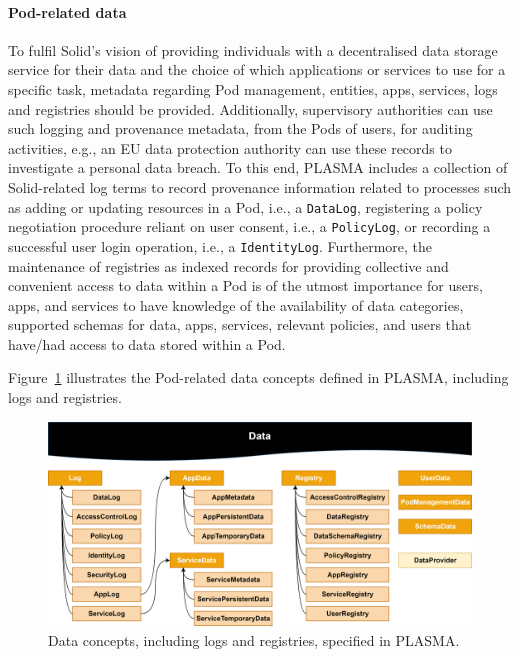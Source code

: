\paragraph{Pod-related data}
To fulfil Solid's vision of providing individuals with a decentralised data storage service for their data and the choice of which applications or services to use for a specific task, metadata regarding Pod management, entities, apps, services, logs and registries should be provided.
Additionally, supervisory authorities can use such logging and provenance metadata, from the Pods of users, for auditing activities, e.g., an EU data protection authority can use these records to investigate a personal data breach.
To this end, PLASMA includes a collection of Solid-related log terms to record provenance information related to processes such as adding or updating resources in a Pod, i.e., a \texttt{DataLog}, registering a policy negotiation procedure reliant on user consent, i.e., a \texttt{PolicyLog}, or recording a successful user login operation, i.e., a \texttt{IdentityLog}.
Furthermore, the maintenance of registries as indexed records for providing collective and convenient access to data within a Pod is of the utmost importance for users, apps, and services to have knowledge of the availability of data categories, supported schemas for data, apps, services, relevant policies, and users that have/had access to data stored within a Pod.

Figure~\ref{fig:plasma_data} illustrates the Pod-related data concepts defined in PLASMA, including logs and registries.

\begin{figure}[htbp]
    \centering
    \includegraphics[width=\linewidth]{figures/chapter-4/data.png}
    \caption{Data concepts, including logs and registries, specified in PLASMA.}
    \label{fig:plasma_data}
\end{figure}

